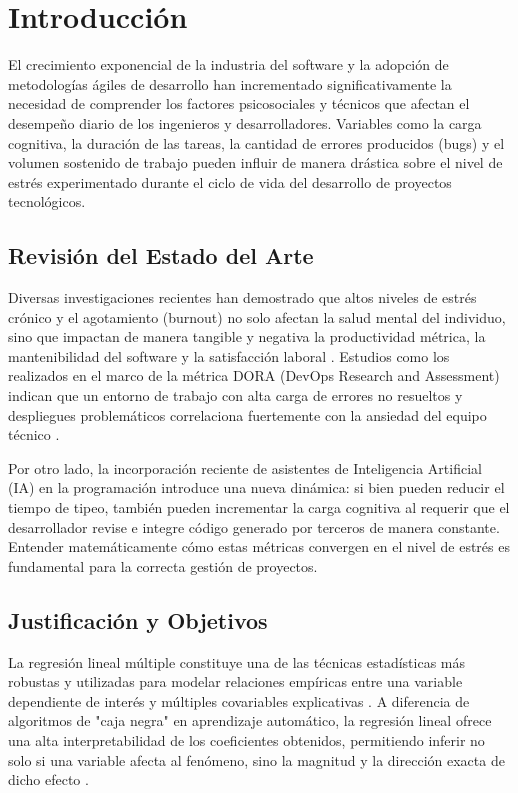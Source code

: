 \documentclass[procedia]{easychair}
\begin{document}

\section{Introducción}

El crecimiento exponencial de la industria del software y la adopción de metodologías ágiles de desarrollo han incrementado significativamente la necesidad de comprender los factores psicosociales y técnicos que afectan el desempeño diario de los ingenieros y desarrolladores. Variables como la carga cognitiva, la duración de las tareas, la cantidad de errores producidos (bugs) y el volumen sostenido de trabajo pueden influir de manera drástica sobre el nivel de estrés experimentado durante el ciclo de vida del desarrollo de proyectos tecnológicos. 

\subsection{Revisión del Estado del Arte}
Diversas investigaciones recientes han demostrado que altos niveles de estrés crónico y el agotamiento (burnout) no solo afectan la salud mental del individuo, sino que impactan de manera tangible y negativa la productividad métrica, la mantenibilidad del software y la satisfacción laboral \cite{softwarestress}. Estudios como los realizados en el marco de la métrica DORA (DevOps Research and Assessment) indican que un entorno de trabajo con alta carga de errores no resueltos y despliegues problemáticos correlaciona fuertemente con la ansiedad del equipo técnico \cite{developerproductivity}. 

Por otro lado, la incorporación reciente de asistentes de Inteligencia Artificial (IA) en la programación introduce una nueva dinámica: si bien pueden reducir el tiempo de tipeo, también pueden incrementar la carga cognitiva al requerir que el desarrollador revise e integre código generado por terceros de manera constante. Entender matemáticamente cómo estas métricas convergen en el nivel de estrés es fundamental para la correcta gestión de proyectos.

\subsection{Justificación y Objetivos}
La regresión lineal múltiple constituye una de las técnicas estadísticas más robustas y utilizadas para modelar relaciones empíricas entre una variable dependiente de interés y múltiples covariables explicativas \cite{montgomery}. A diferencia de algoritmos de "caja negra" en aprendizaje automático, la regresión lineal ofrece una alta interpretabilidad de los coeficientes obtenidos, permitiendo inferir no solo si una variable afecta al fenómeno, sino la magnitud y la dirección exacta de dicho efecto \cite{james}.
\end{document}
